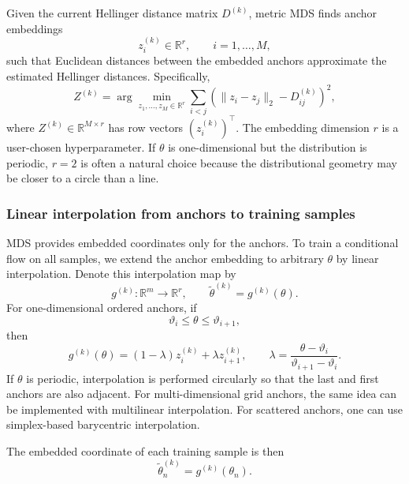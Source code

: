 Given the current Hellinger distance matrix $D^{(k)}$, metric MDS finds anchor embeddings
\begin{equation}
    z_i^{(k)}\in\mathbb{R}^r,
    \qquad
    i=1,\ldots,M,
\end{equation}
such that Euclidean distances between the embedded anchors approximate the estimated Hellinger distances. Specifically,
\begin{equation}
\label{eq:mds-stress}
    Z^{(k)}
    =
    \arg\min_{z_1,\ldots,z_M\in\mathbb{R}^r}
    \sum_{i<j}
    \left(
    \|z_i-z_j\|_2 - D_{ij}^{(k)}
    \right)^2,
\end{equation}
where $Z^{(k)}\in\mathbb{R}^{M\times r}$ has row vectors $(z_i^{(k)})^\top$. The embedding dimension $r$ is a user-chosen hyperparameter. If $\theta$ is one-dimensional but the distribution is periodic, $r=2$ is often a natural choice because the distributional geometry may be closer to a circle than a line.

\subsubsection{Linear interpolation from anchors to training samples}

MDS provides embedded coordinates only for the anchors. To train a conditional flow on all samples, we extend the anchor embedding to arbitrary $\theta$ by linear interpolation. Denote this interpolation map by
\begin{equation}
    g^{(k)}:\mathbb{R}^m\to\mathbb{R}^r,
    \qquad
    \tilde{\theta}^{(k)}=g^{(k)}(\theta).
\end{equation}
For one-dimensional ordered anchors, if
\begin{equation}
    \vartheta_i\leq \theta \leq \vartheta_{i+1},
\end{equation}
then
\begin{equation}
\label{eq:linear-interp}
    g^{(k)}(\theta)
    =
    (1-\lambda)z_i^{(k)}+\lambda z_{i+1}^{(k)},
    \qquad
    \lambda
    =
    \frac{\theta-\vartheta_i}{\vartheta_{i+1}-\vartheta_i}.
\end{equation}
If $\theta$ is periodic, interpolation is performed circularly so that the last and first anchors are also adjacent. For multi-dimensional grid anchors, the same idea can be implemented with multilinear interpolation. For scattered anchors, one can use simplex-based barycentric interpolation.

The embedded coordinate of each training sample is then
\begin{equation}
    \tilde{\theta}_n^{(k)} = g^{(k)}(\theta_n).
\end{equation}

